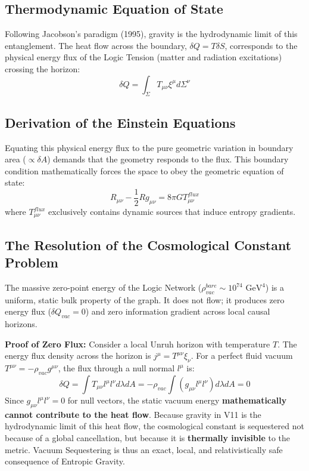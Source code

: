 \documentclass[a4paper,12pt]{article}
\begin{document}
\subsection{Thermodynamic Equation of State}
Following Jacobson's paradigm (1995), gravity is the hydrodynamic limit of this entanglement. The heat flow across the boundary, $\delta Q = T \delta S$, corresponds to the physical energy flux of the Logic Tension (matter and radiation excitations) crossing the horizon:
\begin{equation}
    \delta Q = \int_\Sigma T_{\mu\nu} \xi^\mu d\Sigma^\nu
\end{equation}

\subsection{Derivation of the Einstein Equations}
Equating this physical energy flux to the pure geometric variation in boundary area ($\propto \delta A$) demands that the geometry responds to the flux. This boundary condition mathematically forces the space to obey the geometric equation of state:
\begin{equation}
    R_{\mu\nu} - \frac{1}{2}R g_{\mu\nu} = 8\pi G T_{\mu\nu}^{flux}
\end{equation}
where $T_{\mu\nu}^{flux}$ exclusively contains dynamic sources that induce entropy gradients.

\subsection{The Resolution of the Cosmological Constant Problem}
The massive zero-point energy of the Logic Network ($\rho_{vac}^{bare} \sim 10^{74} \text{ GeV}^4$) is a uniform, static bulk property of the graph. It does not flow; it produces zero energy flux ($\delta Q_{vac} = 0$) and zero information gradient across local causal horizons. 

\textbf{Proof of Zero Flux:}
Consider a local Unruh horizon with temperature $T$. The energy flux density across the horizon is $j^\mu = T^{\mu\nu} \xi_\nu$. For a perfect fluid vacuum $T^{\mu\nu} = -\rho_{vac} g^{\mu\nu}$, the flux through a null normal $l^\mu$ is:
\begin{equation}
    \delta Q = \int T_{\mu\nu} l^\mu l^\nu d\lambda dA = -\rho_{vac} \int (g_{\mu\nu} l^\mu l^\nu) d\lambda dA = 0
\end{equation}
Since $g_{\mu\nu} l^\mu l^\nu = 0$ for null vectors, the static vacuum energy \textbf{mathematically cannot contribute to the heat flow}. Because gravity in V11 is the hydrodynamic limit of this heat flow, the cosmological constant is sequestered not because of a global cancellation, but because it is \textbf{thermally invisible} to the metric. Vacuum Sequestering is thus an exact, local, and relativistically safe consequence of Entropic Gravity.
\end{document}
